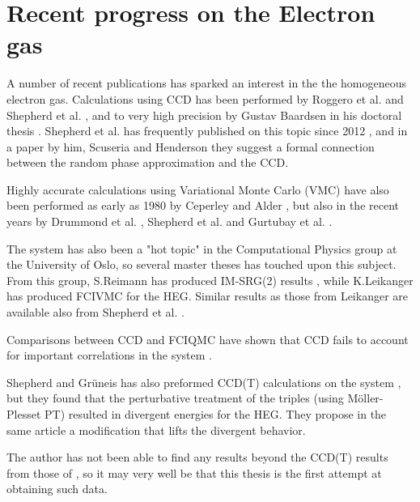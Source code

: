 \FloatBarrier

\section{Recent progress on the Electron gas}

A number of recent publications has sparked an interest in the the homogeneous electron gas. Calculations using CCD has been performed by Roggero et al. \cite{Roggero2013} and Shepherd et al. \cite{Shepherd2012}, and to very high precision by Gustav Baardsen in his doctoral thesis \cite{Baardsen2014}. Shepherd et al. has frequently published on this topic since 2012 \cite{Shepherd2012, Shepherd2012a, Shepherd2013, Shepherd2013c, Shepherd2014}, and in a paper by him, Scuseria and Henderson \cite{Shepherd2014} they suggest a formal connection between the random phase approximation and the CCD. 

Highly accurate calculations using Variational Monte Carlo (VMC) have also been performed as early as 1980 by Ceperley and Alder \cite{Ceperley1980}, but also in the recent years by Drummond et al. \cite{Drummond2006}, Shepherd et al. \cite{Shepherd2012} and Gurtubay et al. \cite{Gurtubay2010}.

The system has also been a "hot topic" in the Computational Physics group at the University of Oslo, so several master theses has touched upon this subject. From this group, S.Reimann has produced IM-SRG(2) results \cite{Reimann2013}, while K.Leikanger has produced FCIVMC \cite{Leikanger2013} for the HEG. Similar results as those from Leikanger are available also from Shepherd et al. \cite{Shepherd2012}.

Comparisons between CCD and FCIQMC have shown that CCD fails to account for important correlations in the system \cite{Baardsen2014}. 

Shepherd and Grüneis has also preformed CCD(T) calculations on the system \cite{Shepherd2013}, but they found that the perturbative treatment of the triples (using Möller-Plesset PT) resulted in divergent energies for the HEG. They propose in the same article a modification that lifts the divergent behavior. 

The author has not been able to find any results beyond the CCD(T) results from those of \cite{Shepherd2013}, so it may very well be that this thesis is the first attempt at obtaining such data. 
